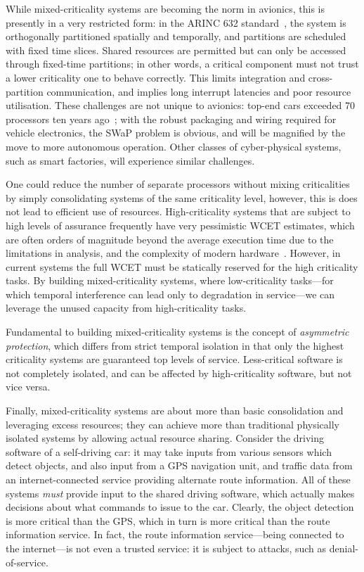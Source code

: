 While mixed-criticality systems are becoming the norm in avionics, this is presently in a very restricted form: in the
ARINC 632 standard~\citep{ARINC653}, the system
is orthogonally partitioned spatially and temporally, and partitions are scheduled with fixed time
slices. Shared resources are permitted but can only be accessed through fixed-time
partitions; in other words, a critical component must not
trust a lower criticality one to behave correctly. This limits integration and cross-partition
communication, and implies long interrupt latencies and poor resource utilisation. 
These challenges are not unique to avionics: top-end cars exceeded 70 processors ten years
ago~\citep{Broy_KPS_07}; with the robust packaging and wiring required for vehicle electronics, the
SWaP problem is obvious, and will be magnified by the move to more autonomous operation. Other
classes of cyber-physical systems, such as smart factories, will experience similar challenges.

One could reduce the number of separate processors without mixing criticalities by simply consolidating 
systems of the same criticality level, however, this is does not lead to efficient use of resources. 
High-criticality systems that are subject to high levels of assurance frequently have very
pessimistic \gls{WCET} estimates,
which are often orders of magnitude beyond the average execution time due to the limitations in analysis,
and the complexity of modern hardware~\citep{Wilhelm_EEHTWBFHMMPPSS_08}. However, in current systems the full \gls{WCET} must be
statically reserved for the high criticality tasks. By building mixed-criticality systems, where
low-criticality tasks---for which temporal interference can lead only to degradation in service---we can
leverage the unused capacity from high-criticality tasks. 

Fundamental to building mixed-criticality systems is the concept of \emph{asymmetric protection},
which differs from strict temporal isolation in that only the highest criticality systems are
guaranteed top levels of service. Less-critical software is not completely isolated, and can be
affected by high-criticality software, but not vice versa. 

Finally, mixed-criticality systems are about more than basic consolidation and leveraging excess
resources; they can achieve more
than traditional physically isolated systems by allowing actual resource sharing. 
Consider the driving software of a self-driving car: it may take inputs from various sensors
which detect objects, and also input from a \gls{GPS} navigation unit, and traffic data from an
internet-connected
service providing alternate route information. All of these systems \emph{must} provide input to the
shared driving software, which actually makes decisions about what commands to issue to the car.
Clearly, the object detection is more critical than the \gls{GPS}, which in turn is more critical than the
route information service. In fact, the route information service---being connected to the
internet---is not even a trusted service: it is subject to attacks, such as denial-of-service. 

